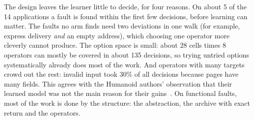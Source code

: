The design leaves the learner little to decide, for four reasons. On about 5 of the 14
applications a fault is found within the first few decisions, before learning can matter.
The faults no arm finds need two deviations in one walk (for example, express delivery
\emph{and} an empty address), which choosing one operator more cleverly cannot produce. The
option space is small: about 28 cells times 8 operators can mostly be covered in about 135
decisions, so trying untried options systematically already does most of the work. And
operators with many targets crowd out the rest: invalid input took 30\% of all decisions
because pages have many fields. This agrees with the Humanoid authors' observation that
their learned model was not the main reason for their gains~\cite{li2019humanoid}. On
functional faults, most of the work is done by the structure: the abstraction, the archive
with exact return and the operators.
